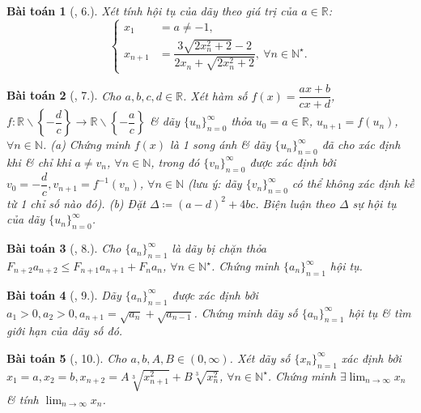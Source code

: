 \documentclass{article}
\newtheorem{baitoan}{Bài toán}
\begin{document}
\begin{baitoan}[\cite{TLCT_dai_so_giai_tich_11}, 6.]
	Xét tính hội tụ của dãy theo giá trị của $a\in\mathbb{R}$:
	\begin{equation*}
		\left\{\begin{split}
			x_1 &= a\ne-1,\\
			x_{n+1} &= \dfrac{3\sqrt{2x_n^2 + 2} - 2}{2x_n + \sqrt{2x_n^2 + 2}},\ \forall n\in\mathbb{N}^\star.
		\end{split}\right.
	\end{equation*}
\end{baitoan}

\begin{baitoan}[\cite{TLCT_dai_so_giai_tich_11}, 7.]
	Cho $a,b,c,d\in\mathbb{R}$. Xét hàm số $f(x) = \dfrac{ax + b}{cx + d}$, $f:\mathbb{R}\backslash\left\{-\dfrac{d}{c}\right\}\to\mathbb{R}\backslash\left\{-\dfrac{a}{c}\right\}$ \& dãy $\{u_n\}_{n=0}^\infty$ thỏa $u_0 = a\in\mathbb{R}$, $u_{n+1} = f(u_n)$, $\forall n\in\mathbb{N}$. (a) Chứng minh $f(x)$ là 1 song ánh \& dãy $\{u_n\}_{n=0}^\infty$ đã cho xác định khi \& chỉ khi $a\ne v_n$, $\forall n\in\mathbb{N}$, trong đó $\{v_n\}_{n=0}^\infty$ được xác định bởi $v_0 = -\dfrac{d}{c},v_{n+1} = f^{-1}(v_n)$, $\forall n\in\mathbb{N}$ (lưu ý: dãy $\{v_n\}_{n=0}^\infty$ có thể không xác định kề từ 1 chỉ số nào đó). (b) Đặt $\Delta\coloneqq(a - d)^2 + 4bc$. Biện luận theo $\Delta$ sự hội tụ của dãy $\{u_n\}_{n=0}^\infty$.
\end{baitoan}

\begin{baitoan}[\cite{TLCT_dai_so_giai_tich_11}, 8.]
	Cho $\{a_n\}_{n=1}^\infty$ là dãy bị chặn thỏa $F_{n+2}a_{n+2}\le F_{n+1}a_{n+1} + F_na_n$, $\forall n\in\mathbb{N}^\star$. Chứng minh $\{a_n\}_{n=1}^\infty$ hội tụ.
\end{baitoan}

\begin{baitoan}[\cite{TLCT_dai_so_giai_tich_11}, 9.]
	Dãy $\{a_n\}_{n=1}^\infty$ được xác định bởi $a_1 > 0,a_2 > 0,a_{n+1} = \sqrt{a_n} + \sqrt{a_{n-1}}$. Chứng minh dãy số $\{a_n\}_{n=1}^\infty$ hội tụ \& tìm giới hạn của dãy số đó.
\end{baitoan}

\begin{baitoan}[\cite{TLCT_dai_so_giai_tich_11}, 10.]
	Cho $a,b,A,B\in(0,\infty)$. Xét dãy số $\{x_n\}_{n=1}^\infty$ xác định bởi $x_1 = a,x_2 = b,x_{n+2} = A\sqrt[3]{x_{n+1}^2} + B\sqrt[3]{x_n^2}$, $\forall n\in\mathbb{N}^\star$. Chứng minh $\exists\lim_{n\to\infty} x_n$ \& tính $\lim_{n\to\infty} x_n$.
\end{baitoan}
\end{document}
